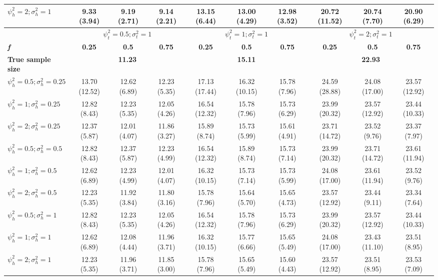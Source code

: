 \begin{table}[ht]
{\begin{tabular}{l c c c c c c c c c}
$\psi_h^2 = 2; \sigma_h^2 = 1$ & 9.33 (3.94) & 9.19 (2.71) & 9.14 (2.21) & 13.15 (6.44) & 13.00 (4.29) & 12.98 (3.52) & 20.72 (11.52) & 20.74 (7.70) & 20.90 (6.29) \\
\hline 
 & \multicolumn{3}{c}{$\psi_t^2 = 0.5; \sigma_t^2 = 1$} & \multicolumn{3}{c}{$\psi_t^2 = 1; \sigma_t^2 = 1$} & \multicolumn{3}{c}{$\psi_t^2 = 2; \sigma_t^2 = 1$} \\
\addlinespace[1pt]
\cmidrule(lr){2-4} \cmidrule(lr){5-7} \cmidrule(lr){8-10}
\textbf{\textit{f}} & \textbf{0.25} & \textbf{0.5} & \textbf{0.75} & \textbf{0.25} & \textbf{0.5} & \textbf{0.75} & \textbf{0.25} & \textbf{0.5} & \textbf{0.75} \\
\hline
\textbf{True sample size} & \multicolumn{3}{c}{\textbf{11.23}} & \multicolumn{3}{c}{\textbf{15.11}} & \multicolumn{3}{c}{\textbf{22.93}} \\
$\psi_h^2 = 0.5; \sigma_h^2 = 0.25$ & 13.70 (12.52) & 12.62 (6.89) & 12.23 (5.35) & 17.13 (17.44) & 16.32 (10.15) & 15.78 (7.96) & 24.59 (28.88) & 24.08 (17.00) & 23.57 (12.92) \\
$\psi_h^2 = 1; \sigma_h^2 = 0.25$ & 12.82 (8.43) & 12.23 (5.35) & 12.05 (4.26) & 16.54 (12.32) & 15.78 (7.96) & 15.73 (6.29) & 23.99 (20.32) & 23.57 (12.92) & 23.44 (10.33) \\
$\psi_h^2 = 2; \sigma_h^2 = 0.25$ & 12.37 (5.87) & 12.01 (4.07) & 11.86 (3.27) & 15.89 (8.74) & 15.73 (5.99) & 15.61 (4.91) & 23.71 (14.72) & 23.52 (9.76) & 23.37 (7.97) \\
$\psi_h^2 = 0.5; \sigma_h^2 = 0.5$ & 12.82 (8.43) & 12.37 (5.87) & 12.23 (4.99) & 16.54 (12.32) & 15.89 (8.74) & 15.73 (7.14) & 23.99 (20.32) & 23.71 (14.72) & 23.61 (11.94) \\
$\psi_h^2 = 1; \sigma_h^2 = 0.5$ & 12.62 (6.89) & 12.23 (4.99) & 12.01 (4.07) & 16.32 (10.15) & 15.73 (7.14) & 15.73 (5.99) & 24.08 (17.00) & 23.61 (11.94) & 23.52 (9.76) \\
$\psi_h^2 = 2; \sigma_h^2 = 0.5$ & 12.23 (5.35) & 11.92 (3.84) & 11.80 (3.16) & 15.78 (7.96) & 15.64 (5.70) & 15.65 (4.73) & 23.57 (12.92) & 23.44 (9.11) & 23.34 (7.64) \\
$\psi_h^2 = 0.5; \sigma_h^2 = 1$ & 12.82 (8.43) & 12.23 (5.35) & 12.05 (4.26) & 16.54 (12.32) & 15.78 (7.96) & 15.73 (6.29) & 23.99 (20.32) & 23.57 (12.92) & 23.44 (10.33) \\
$\psi_h^2 = 1; \sigma_h^2 = 1$ & 12.62 (6.89) & 12.08 (4.44) & 11.96 (3.71) & 16.32 (10.15) & 15.77 (6.66) & 15.65 (5.49) & 24.08 (17.00) & 23.43 (11.10) & 23.51 (8.95) \\
$\psi_h^2 = 2; \sigma_h^2 = 1$ & 12.23 (5.35) & 11.96 (3.71) & 11.85 (3.00) & 15.78 (7.96) & 15.65 (5.49) & 15.60 (4.43) & 23.57 (12.92) &  23.51 (8.95) & 23.53 (7.09) \\
\bottomrule
\end{tabular}}
\end{table}


